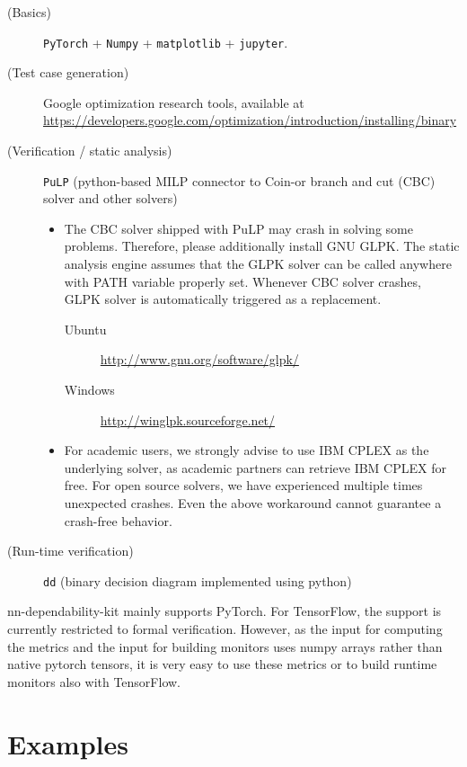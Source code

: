 \documentclass{article}
\begin{document}
\begin{description}
\item[(Basics)] \texttt{PyTorch} + \texttt{Numpy} + \texttt{matplotlib} + \texttt{jupyter}. 
\item[(Test case generation)] Google optimization research tools, available at \\ {\small\url{https://developers.google.com/optimization/introduction/installing/binary}}

\item[(Verification / static analysis)] \texttt{PuLP} (python-based MILP connector to Coin-or branch and cut (CBC) solver and other solvers)
\begin{itemize}
    \item The CBC solver shipped with PuLP may crash in solving some problems. Therefore, please additionally install GNU GLPK. The static analysis engine assumes that the GLPK solver can be called anywhere with PATH variable properly set. Whenever CBC solver crashes, GLPK solver is automatically triggered as a replacement.
    \begin{description}
    	\item[Ubuntu] \url{http://www.gnu.org/software/glpk/}
    	\item[Windows] \url{http://winglpk.sourceforge.net/}
    \end{description}
    
    \item For academic users, we strongly advise to use IBM CPLEX as the underlying solver, as academic partners can retrieve IBM CPLEX for free. For open source solvers, we have experienced multiple times unexpected crashes. Even the above workaround cannot guarantee a crash-free behavior. 
\end{itemize}
\item[(Run-time verification)] \texttt{dd} (binary decision diagram implemented using python)
\end{description}

\textsf{nn-dependability-kit} mainly supports PyTorch. For TensorFlow, the support is currently restricted to formal verification. However, as the input for computing the metrics and the input for building monitors uses numpy arrays rather than native pytorch tensors, it is very easy to use these metrics or to build runtime monitors also with TensorFlow. 



\section{Examples}
\end{document}
